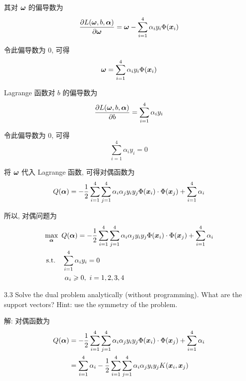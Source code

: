 \documentclass{article}
\begin{document}
其对 $\bm{\omega}$ 的偏导数为
\begin{equation}
  \frac{\partial L(\bm{\omega},b,\bm{\alpha})}{\partial\bm{\omega}}=\bm{\omega}-\sum_{i=1}^4\alpha_iy_i\Phi(\bm{x}_i)
\end{equation}

令此偏导数为 0, 可得
\begin{equation}
  \bm{\omega}=\sum_{i=1}^4\alpha_iy_i\Phi(\bm{x}_i)
\end{equation}

Lagrange 函数对 $b$ 的偏导数为
\begin{equation}
  \frac{\partial L(\bm{\omega},b,\bm{\alpha})}{\partial b}=\sum_{i=1}^4\alpha_iy_i
\end{equation}

令此偏导数为 0, 可得
\begin{equation}
  \sum_{i=1}^4\alpha_iy_i=0
\end{equation}

将 $\bm{\omega}$ 代入 Lagrange 函数, 可得对偶函数为
\begin{equation}
  Q(\bm{\alpha})=-\frac{1}{2}\sum_{i=1}^4\sum_{j=1}^4\alpha_i\alpha_jy_iy_j\Phi(\bm{x}_i)\cdot\Phi(\bm{x}_j)+\sum_{i=1}^4\alpha_i
\end{equation}

所以, 对偶问题为
\begin{equation}
  \begin{aligned}
    &\max_{\bm{\alpha}}~Q(\bm{\alpha})=-\frac{1}{2}\sum_{i=1}^4\sum_{j=1}^4\alpha_i\alpha_jy_iy_j\Phi(\bm{x}_i)\cdot\Phi(\bm{x}_j)+\sum_{i=1}^4\alpha_i\\
    &~\mathrm{s.t.}\quad\sum_{i=1}^4\alpha_iy_i=0\\
    &\quad\quad~~~\alpha_i\geqslant0,~i=1,2,3,4
  \end{aligned}
\end{equation}

3.3 Solve the dual problem analytically (without programming). What are the support vectors? Hint: use the symmetry of the problem.

解: 对偶函数为
\begin{equation}
  \begin{aligned}
    Q(\bm{\alpha})
    &=-\frac{1}{2}\sum_{i=1}^4\sum_{j=1}^4\alpha_i\alpha_jy_iy_j\Phi(\bm{x}_i)\cdot\Phi(\bm{x}_j)+\sum_{i=1}^4\alpha_i\\
    &=\sum_{i=1}^4\alpha_i-\frac{1}{2}\sum_{i=1}^4\sum_{j=1}^4\alpha_i\alpha_jy_iy_jK(\bm{x}_i,\bm{x}_j)\\
  \end{aligned}
\end{equation}
\end{document}
